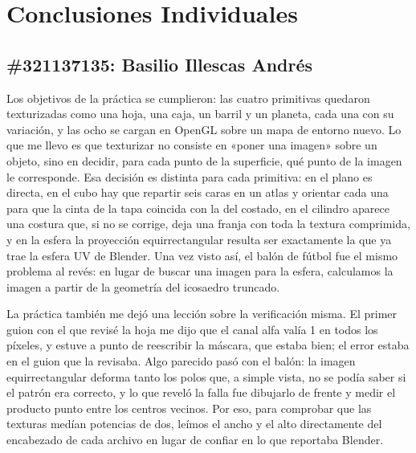
\section{Conclusiones Individuales}

\subsection*{\#321137135: Basilio Illescas Andrés}
Los objetivos de la práctica se cumplieron: las cuatro primitivas quedaron texturizadas como una hoja, una caja, un barril y un planeta, cada una con su variación, y las ocho se cargan en OpenGL sobre un mapa de entorno nuevo. Lo que me llevo es que texturizar no consiste en «poner una imagen» sobre un objeto, sino en decidir, para cada punto de la superficie, qué punto de la imagen le corresponde. Esa decisión es distinta para cada primitiva: en el plano es directa, en el cubo hay que repartir seis caras en un atlas y orientar cada una para que la cinta de la tapa coincida con la del costado, en el cilindro aparece una costura que, si no se corrige, deja una franja con toda la textura comprimida, y en la esfera la proyección equirrectangular resulta ser exactamente la que ya trae la esfera UV de Blender. Una vez visto así, el balón de fútbol fue el mismo problema al revés: en lugar de buscar una imagen para la esfera, calculamos la imagen a partir de la geometría del icosaedro truncado.

La práctica también me dejó una lección sobre la verificación misma. El primer guion con el que revisé la hoja me dijo que el canal alfa valía 1 en todos los píxeles, y estuve a punto de reescribir la máscara, que estaba bien; el error estaba en el guion que la revisaba. Algo parecido pasó con el balón: la imagen equirrectangular deforma tanto los polos que, a simple vista, no se podía saber si el patrón era correcto, y lo que reveló la falla fue dibujarlo de frente y medir el producto punto entre los centros vecinos. Por eso, para comprobar que las texturas medían potencias de dos, leímos el ancho y el alto directamente del encabezado de cada archivo en lugar de confiar en lo que reportaba Blender.

